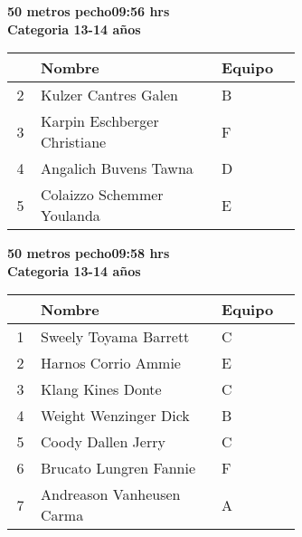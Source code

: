 \begin{minipage}{0.95\linewidth}\vspace{0.5cm} 
\begin{flushleft}
\textbf{
\hspace{-0.15cm}50 metros pecho\hspace{1.5cm}09:56 hrs \\Categoria 13-14 años}\vspace{-0.2cm} 
\end{flushleft}
\begin{tabular}{cp{0.63\linewidth}l}
\hline
& \textbf{Nombre} & \textbf{Equipo} \\ \hline
2 & Kulzer Cantres Galen & B \\ 
3 & Karpin Eschberger Christiane & F \\ 
4 & Angalich Buvens Tawna & D \\ 
5 & Colaizzo Schemmer Youlanda & E \\ 
\end{tabular}
\end{minipage}
\begin{minipage}{0.95\linewidth}\vspace{0.5cm} 
\begin{flushleft}
\textbf{
\hspace{-0.15cm}50 metros pecho\hspace{1.5cm}09:58 hrs \\Categoria 13-14 años}\vspace{-0.2cm} 
\end{flushleft}
\begin{tabular}{cp{0.63\linewidth}l}
\hline
& \textbf{Nombre} & \textbf{Equipo} \\ \hline
1 & Sweely Toyama Barrett & C \\ 
2 & Harnos Corrio Ammie & E \\ 
3 & Klang Kines Donte & C \\ 
4 & Weight Wenzinger Dick & B \\ 
5 & Coody Dallen Jerry & C \\ 
6 & Brucato Lungren Fannie & F \\ 
7 & Andreason Vanheusen Carma & A \\ 
\end{tabular}
\end{minipage}
